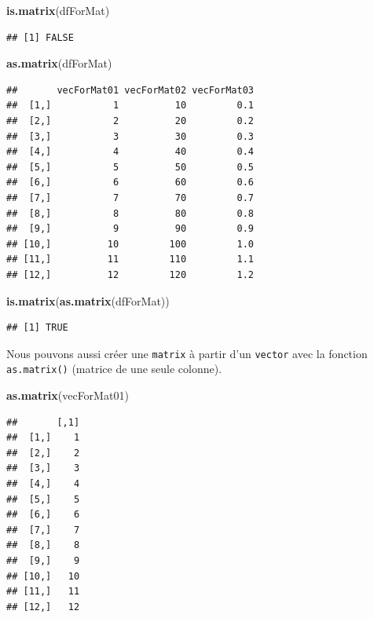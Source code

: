 \documentclass[]{book}
\newenvironment{Shaded}{\begin{snugshade}}{\end{snugshade}}
\newcommand{\KeywordTok}[1]{\textcolor[rgb]{0.13,0.29,0.53}{\textbf{#1}}}
\newcommand{\NormalTok}[1]{#1}
\begin{document}
\begin{Shaded}
\begin{Highlighting}[]
\KeywordTok{is.matrix}\NormalTok{(dfForMat)}
\end{Highlighting}
\end{Shaded}

\begin{verbatim}
## [1] FALSE
\end{verbatim}

\begin{Shaded}
\begin{Highlighting}[]
\KeywordTok{as.matrix}\NormalTok{(dfForMat)}
\end{Highlighting}
\end{Shaded}

\begin{verbatim}
##       vecForMat01 vecForMat02 vecForMat03
##  [1,]           1          10         0.1
##  [2,]           2          20         0.2
##  [3,]           3          30         0.3
##  [4,]           4          40         0.4
##  [5,]           5          50         0.5
##  [6,]           6          60         0.6
##  [7,]           7          70         0.7
##  [8,]           8          80         0.8
##  [9,]           9          90         0.9
## [10,]          10         100         1.0
## [11,]          11         110         1.1
## [12,]          12         120         1.2
\end{verbatim}

\begin{Shaded}
\begin{Highlighting}[]
\KeywordTok{is.matrix}\NormalTok{(}\KeywordTok{as.matrix}\NormalTok{(dfForMat))}
\end{Highlighting}
\end{Shaded}

\begin{verbatim}
## [1] TRUE
\end{verbatim}

Nous pouvons aussi créer une \texttt{matrix} à partir d'un \texttt{vector} avec la fonction \texttt{as.matrix()} (matrice de une seule colonne).

\begin{Shaded}
\begin{Highlighting}[]
\KeywordTok{as.matrix}\NormalTok{(vecForMat01)}
\end{Highlighting}
\end{Shaded}

\begin{verbatim}
##       [,1]
##  [1,]    1
##  [2,]    2
##  [3,]    3
##  [4,]    4
##  [5,]    5
##  [6,]    6
##  [7,]    7
##  [8,]    8
##  [9,]    9
## [10,]   10
## [11,]   11
## [12,]   12
\end{verbatim}
\end{document}
